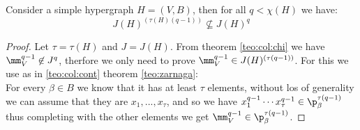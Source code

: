 \begin{teo} \label{teo:borin1}
	Consider a simple hypergraph $H = (V,B)$, then for all $ q < \chi(H)$ we have: 
	\[ J(H)^{( \tau(H)(q-1) )} \not \subseteq J(H)^q \]
\end{teo}

\begin{proof}
	Let $\tau = \tau (H)$ and $ J = J(H) $. From theorem \ref{teo:col:chi} we have $\mm_V^{q-1} \not \in J^q$, therfore we only need to prove $ \mm_V^{q-1} \in J(H)^{( \tau (q-1) )}$. For this we use as in \ref{teo:col:cont} theorem \ref{teo:zarnaga}:\\
For every $\beta \in B $ we know that it has at least $	\tau$ elements, without los of generality we can assume that they are $x_1 , ... , x_\tau$, and so we have $x_1^{q-1} \cdots  x_\tau^{q-1} \in \p_\beta^{\tau(q -1)} $ thus completing with the other elements we get $\mm_V^{q-1} \in \p_\beta^{\tau(q -1)} $. 
\end{proof} 

